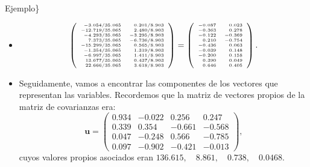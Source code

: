 \documentclass[
  spanish,
  ignorenonframetext,
]{beamer}
\providecommand{\tightlist}{%
  \setlength{\itemsep}{0pt}\setlength{\parskip}{0pt}}
\begin{document}
\begin{frame}{Ejemplo\}}
\protect\hypertarget{ejemplo-26}{}
\begin{itemize}
\tightlist
\item
  \[
  {\tiny
  \left(
  \begin{array}{rr}
  -3.054/35.065  &  0.201/8.903 \\
   -12.719/35.065  &  2.480/8.903 \\
   -4.293/35.065  &  -3.295/8.903 \\
   7.373/35.065  &  -6.736/8.903 \\
   -15.299/35.065  &  0.565/8.903 \\
   -1.354/35.065  &  1.319/8.903 \\
   -6.997/35.065  &  1.411/8.903 \\
   13.677/35.065  &  0.437/8.903 \\
   22.666/35.065  &  3.618/8.903 \\
  \end{array}
  \right)=
  \left(
  \begin{array}{rr}
  -0.087 & 0.023 \\
   -0.363 & 0.278 \\
   -0.122 & -0.369 \\
   0.210 & -0.754 \\
   -0.436 & 0.063 \\
   -0.039 & 0.148 \\
   -0.200 & 0.158 \\
   0.390 & 0.049 \\
   0.646 & 0.405 \\
  \end{array}
  \right).}
  \]
\item
  Seguidamente, vamos a encontrar las componentes de los vectores que
  representan las variables. Recordemos que la matriz de vectores
  propios de la matriz de covarianzas era: \[
  \mathbf{u}=
  \left(
  \begin{array}{rrrr}
  0.934 & -0.022 & 0.256 & 0.247 \\
   0.339 & 0.354 & -0.661 & -0.568 \\
   0.047 & -0.248 & 0.566 & -0.785 \\
   0.097 & -0.902 & -0.421 & -0.013 
  \end{array}
  \right),
  \] cuyos valores propios asociados eran
  \(136.615,\quad 8.861,\quad 0.738,\quad 0.0468.\)
\end{itemize}
\end{frame}
\end{document}
